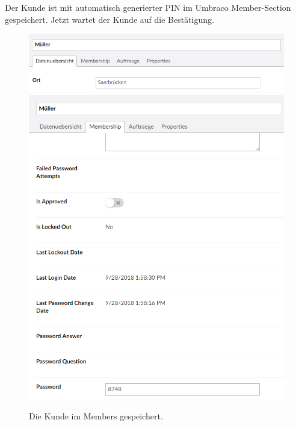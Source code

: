 Der Kunde ist mit automatisch generierter PIN im Umbraco Member-Section gespeichert. Jetzt wartet der Kunde auf die Bestätigung.

\begin{figure}[h]
	\centering
	\includegraphics[width=1\linewidth]{Graphics/MemberDatenuebersicht.png}
	\includegraphics[width=1\linewidth]{Graphics/MemberMembership.png}
	\caption[MemberDatenuebersicht]{Die Kunde im Members gespeichert.}
	\label{fig: MemberDatenuebersicht}
\end{figure}

\newpage

